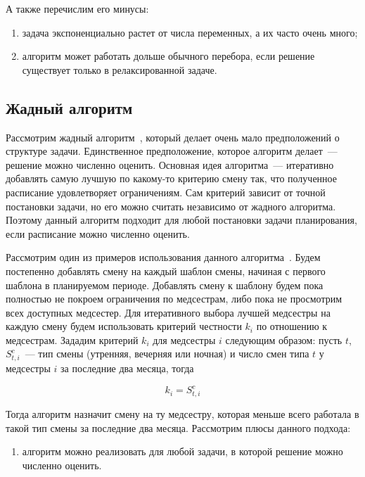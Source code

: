 \documentclass[times,specification,annotation]{itmo-student-thesis}
\begin{document}
А также перечислим его минусы:

\begin{enumerate}
    \item задача экспоненциально растет от числа переменных, а их часто очень много;
    \item алгоритм может работать дольше обычного перебора, если решение существует только в релаксированной задаче.
\end{enumerate}

\subsection{Жадный алгоритм}

Рассмотрим жадный алгоритм~\cite{BELLANTI200428}, который делает очень мало предположений о структуре задачи.
Единственное предположение, которое алгоритм делает~--- решение можно численно оценить.
Основная идея алгоритма~--- итеративно добавлять самую лучшую по какому-то критерию смену так, что полученное расписание удовлетворяет ограничениям.
Сам критерий зависит от точной постановки задачи, но его можно считать независимо от жадного алгоритма.
Поэтому данный алгоритм подходит для любой постановки задачи планирования, если расписание можно численно оценить.

Рассмотрим один из примеров использования данного алгоритма~\cite{BELLANTI200428}.
Будем постепенно добавлять смену на каждый шаблон смены, начиная с первого шаблона в планируемом периоде.
Добавлять смену к шаблону будем пока полностью не покроем ограничения по медсестрам, либо пока не просмотрим всех доступных медсестер.
Для итеративного выбора лучшей медсестры на каждую смену будем использовать критерий честности $k_i$ по отношению к медсестрам.
Зададим критерий $k_i$ для медсестры $i$ следующим образом: пусть $t$, $S^c_{t, i}$~--- тип смены (утренняя, вечерняя или ночная) и число смен типа $t$ у медсестры $i$ за последние два месяца, тогда

\begin{equation} k_i = S^c_{t, i} \end{equation}

Тогда алгоритм назначит смену на ту медсестру, которая меньше всего работала в такой тип смены за последние два месяца.
Рассмотрим плюсы данного подхода:

\begin{enumerate}
    \item алгоритм можно реализовать для любой задачи, в которой решение можно численно оценить.
\end{enumerate}
\end{document}
